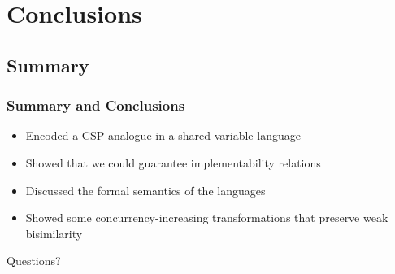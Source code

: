 \documentclass[compress]{beamer}
\begin{document}
\section{Conclusions}
\subsection{Summary}
\begin{frame}
\frametitle{Summary and Conclusions}
\begin{itemize}
\item Encoded a CSP analogue in a shared-variable language
\pause
\item Showed that we could guarantee implementability relations
\pause
\item Discussed the formal semantics of the languages
\pause
\item Showed some concurrency-increasing transformations that preserve weak bisimilarity
\end{itemize}
\end{frame}
\begin{frame}[plain]
\begin{center}
\Huge Questions?
\end{center}
\end{frame}
\end{document}
